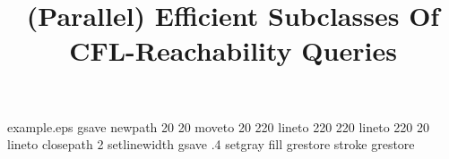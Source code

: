 %
%
%
%
%
\begin{filecontents*}{example.eps}
gsave
newpath
  20 20 moveto
  20 220 lineto
  220 220 lineto
  220 20 lineto
closepath
2 setlinewidth
gsave
  .4 setgray fill
grestore
stroke
grestore
\end{filecontents*}
%
\RequirePackage{fix-cm}
%
\documentclass[smallextended]{svjour3}       %
%
\smartqed  %
%
\usepackage{graphicx}
\usepackage[numbers]{natbib}
\usepackage{bussproofs}
\usepackage{amsmath}
\usepackage{tikz}
\usetikzlibrary{positioning}
\usetikzlibrary{decorations.pathmorphing}


\usepackage[T1]{fontenc}
\DeclareMathAlphabet{} {mb} {it}


%
%
%
%
%



\title{(Parallel) Efficient Subclasses Of CFL-Reachability Queries%
}

